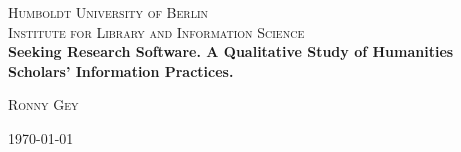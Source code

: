 \documentclass[12pt,a4paper,titlepage,oneside,abstract=true,toc=listof,toc=bibliography]{scrreprt}
\begin{document}

\begin{titlepage} %
	\newcommand{\HRule}{\rule{\linewidth}{0.5mm}} %
	
	\center %
	
	
	\textsc{\LARGE Humboldt University of Berlin}\\[1.5cm] %
	
	\textsc{\Large Institute for Library and Information Science}\\[0.5cm] %
	
	
	
	\vfill
	{\large\textbf{Seeking Research Software. A Qualitative Study of Humanities Scholars' Information Practices.}}\\[0.4cm] %
	
	\vfill	
	
	
			\large
			\textsc{Ronny Gey} %
	
	
	\vfill\vfill\vfill %
	
	{\large\today} %
	
	

\end{titlepage}
\end{document}
